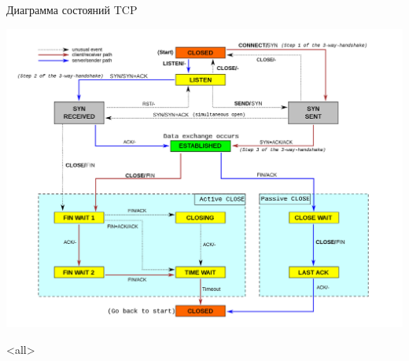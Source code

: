 \begin{frame}{Диаграмма состояний TCP}
	\begin{center}
		\includegraphics[height=0.8\textheight]{04-2000px-Tcp_state_diagram.png}
	\end{center}
\end{frame}


\mode<all>{}


